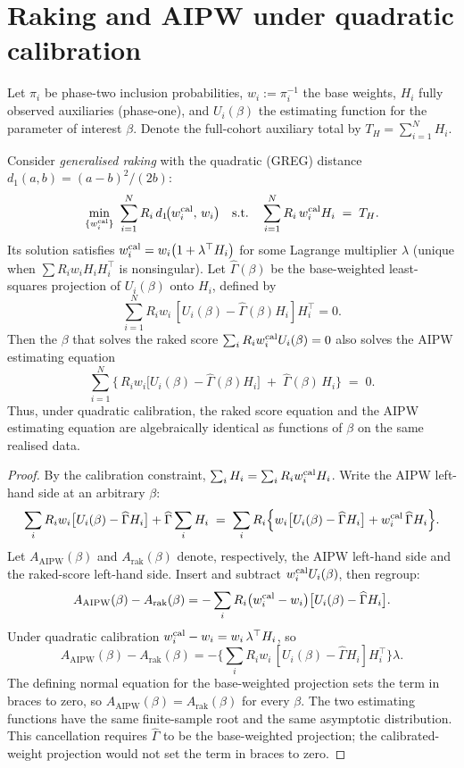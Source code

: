 \section{Raking and AIPW under quadratic calibration}\label{app:calib-aipw}

Let $\pi_i$ be phase-two inclusion probabilities, $w_i:=\pi_i^{-1}$ the base weights, $H_i$ fully observed auxiliaries (phase-one), and $U_i(\beta)$ the estimating function for the parameter of interest $\beta$. Denote the full-cohort auxiliary total by $T_H=\sum_{i=1}^N H_i$.

\begin{proposition}[Raking $=$ AIPW under quadratic calibration]\label{prop:raking-aipw}
Consider \emph{generalised raking} with the quadratic (GREG) distance $d_1(a,b)=(a-b)^2/(2b)$:
\[
\min_{\{w_i^{\rm cal}\}}\ \sum_{i=1}^N R_i\,d_1\!\big(w_i^{\rm cal},\,w_i\big) \quad\text{s.t.}\quad \sum_{i=1}^N R_i\,w_i^{\rm cal} H_i \;=\; T_H.
\]
Its solution satisfies $w_i^{\rm cal} = w_i\bigl(1+\lambda^\top H_i\bigr)$ for some Lagrange multiplier $\lambda$ (unique when $\sum R_i w_i H_iH_i^\top$ is nonsingular). Let $\widehat\Gamma(\beta)$ be the base-weighted least-squares projection of $U_i(\beta)$ onto $H_i$, defined by
\[
\sum_{i=1}^N R_i w_i\,[U_i(\beta)-\widehat\Gamma(\beta)H_i]H_i^\top=0 .
\]
Then the $\beta$ that solves the raked score $\sum_i R_i w_i^{\rm cal} U_i(\beta)=0$ also solves the AIPW estimating equation
\[
\sum_{i=1}^N\Big\{\, R_i w_i\big[U_i(\beta)-\widehat\Gamma(\beta)H_i\big] \;+\; \widehat\Gamma(\beta)\,H_i \Big\}\;=\;0.
\]
Thus, under quadratic calibration, the raked score equation and the AIPW estimating equation are algebraically identical as functions of $\beta$ on the same realised data.
\end{proposition}

\begin{proof}
By the calibration constraint, $\sum_i H_i=\sum_i R_i w_i^{\rm cal}H_i$. Write the AIPW left-hand side at an arbitrary $\beta$:
\[
\sum_i R_i w_i\big[U_i(\beta)-\widehat\Gamma H_i\big] + \widehat\Gamma\sum_i H_i \;=\; \sum_i R_i\Big\{ w_i\big[U_i(\beta)-\widehat\Gamma H_i\big] + w_i^{\rm cal}\,\widehat\Gamma H_i \Big\}.
\]
Let $A_{\mathrm{AIPW}}(\beta)$ and $A_{\mathrm{rak}}(\beta)$ denote, respectively, the AIPW left-hand side and the raked-score left-hand side. Insert and subtract $w_i^{\rm cal}U_i(\beta)$, then regroup:
\[
A_{\mathrm{AIPW}}(\beta)-A_{\mathrm{rak}}(\beta)
=-\sum_i R_i\big(w_i^{\rm cal}-w_i\big)\big[U_i(\beta)-\widehat\Gamma H_i\big].
\]
Under quadratic calibration $w_i^{\rm cal}-w_i = w_i\,\lambda^\top H_i$, so
\[
A_{\mathrm{AIPW}}(\beta)-A_{\mathrm{rak}}(\beta)
=-\Bigg\{\sum_i R_i w_i\,[U_i(\beta)-\widehat\Gamma H_i]H_i^\top\Bigg\}\lambda .
\]
The defining normal equation for the base-weighted projection sets the term in braces to zero, so $A_{\mathrm{AIPW}}(\beta)=A_{\mathrm{rak}}(\beta)$ for every $\beta$. The two estimating functions have the same finite-sample root and the same asymptotic distribution. This cancellation requires $\widehat\Gamma$ to be the base-weighted projection; the calibrated-weight projection would not set the term in braces to zero.
\end{proof}

